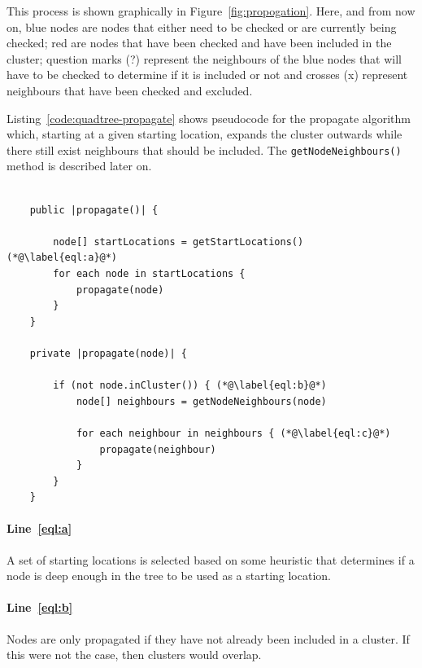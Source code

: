 This process is shown graphically in Figure~\ref{fig:propogation}. Here, and
from now on, blue nodes are nodes that either need to be checked or are
currently being checked; red are nodes that have been checked and have been
included in the cluster; question marks ({\footnotesize?}) represent the
neighbours of the blue nodes that will have to be checked to determine if it is
included or not and crosses ({\footnotesize x}) represent neighbours that have
been checked and excluded.

Listing~\ref{code:quadtree-propagate} shows pseudocode for the propagate
algorithm which, starting at a given starting location, expands the cluster
outwards while there still exist neighbours that should be included. The
\texttt{getNodeNeighbours()} method is described later on.

\begin{center}
\begin{minipage}{\textwidth}
\begin{lstlisting}[caption={[Code for the propagate algorithm.]Code for the
	propagate algorithm which expands an inital starting location to a
	cluster.}, label=code:quadtree-propagate]

	public |propagate()| {

		node[] startLocations = getStartLocations() (*@\label{eql:a}@*)
		for each node in startLocations {
			propagate(node)
		}
	}

	private |propagate(node)| {

		if (not node.inCluster()) { (*@\label{eql:b}@*)
			node[] neighbours = getNodeNeighbours(node)

			for each neighbour in neighbours { (*@\label{eql:c}@*)
				propagate(neighbour)
			}
		}
	}
\end{lstlisting}
\end{minipage}
\end{center}

\paragraph{Line~\ref{eql:a}} A set of starting locations is selected based on
some heuristic that determines if a node is deep enough in the tree to be used
as a starting location.

\paragraph{Line~\ref{eql:b}} Nodes are only propagated if they have not already
been included in a cluster. If this were not the case, then clusters would
overlap.


